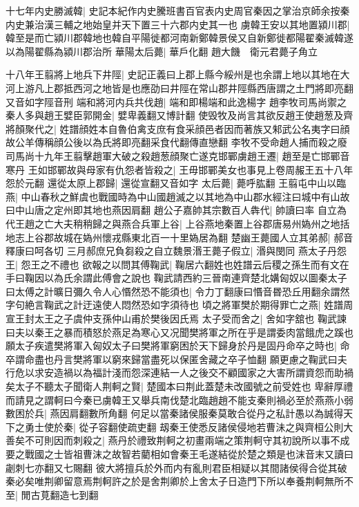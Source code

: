 十七年内史勝滅韓|{
	史記本紀作内史騰班書百官表内史周官秦因之掌治京師余按秦内史兼治漢三輔之地始皇并天下置三十六郡内史其一也}
虜韓王安以其地置潁川郡|{
	韓至是而亡潁川郡韓地也韓自平陽徙都河南新鄭韓景侯又自新鄭徙都陽翟秦滅韓遂以為陽翟縣為潁川郡治所}
華陽太后薨|{
	華戶化翻}
趙大饑　衛元君薨子角立

十八年王翦將上地兵下井陘|{
	史記正義曰上郡上縣今綏州是也余謂上地以其地在大河上游凡上郡抵西河之地皆是也應劭曰井陘在常山郡井陘縣西唐謂之土門將即亮翻又音如字陘音刑}
端和將河内兵共伐趙|{
	端和即楊端和此逸楊字}
趙李牧司馬尚禦之秦人多與趙王嬖臣郭開金|{
	嬖卑義翻又博計翻}
使毁牧及尚言其欲反趙王使趙葱及齊將顏聚代之|{
	姓譜顔姓本自魯伯禽支庶有食采顔邑者因而著族又邾武公名夷字曰顔故公羊傳稱顔公後以為氏將即亮翻采食代翻傳直戀翻}
李牧不受命趙人捕而殺之廢司馬尚十九年王翦擊趙軍大破之殺趙葱顔聚亡遂克邯鄲虜趙王遷|{
	趙至是亡邯鄲音寒丹}
王如邯鄲故與母家有仇怨者皆殺之|{
	王毋邯鄲美女也事見上卷周赧王五十八年怨於元翻}
還從太原上郡歸|{
	還從宣翻又音如字}
太后薨|{
	薨呼肱翻}
王翦屯中山以臨燕|{
	中山春秋之鮮虞也戰國時為中山國趙滅之以其地為中山郡水經注曰城中有山故曰中山唐之定州即其地也燕因肩翻}
趙公子嘉帥其宗數百人犇代|{
	帥讀曰率}
自立為代王趙之亡大夫稍稍歸之與燕合兵軍上谷|{
	上谷燕地秦置上谷郡唐易州媯州之地括地志上谷郡故城在媯州懷戎縣東北百一十里媯居為翻}
楚幽王薨國人立其弟郝|{
	郝音釋康曰呵各切}
三月郝庶兄負芻殺之自立魏景湣王薨子假立|{
	湣與閔同}
燕太子丹怨王|{
	怨王之不禮也}
欲報之以問其傅鞠武|{
	鞠居六翻姓也姓譜云后稷之孫生而有文在手曰鞠因以為氏余謂此傅會之說也}
鞠武請西約三晉南連齊楚北媾匈奴以圖秦太子曰太傅之計曠日彌久令人心惽然恐不能須也|{
	令力丁翻康曰惽音昬恐丘用翻余謂然字句絶言鞠武之計迂遠使人悶然恐如字須待也}
頃之將軍樊於期得罪亡之燕|{
	姓譜周宣王封太王之子虞仲支孫仲山甫於樊後因氏焉}
太子受而舍之|{
	舍如字舘也}
鞠武諫曰夫以秦王之暴而積怒於燕足為寒心又况聞樊將軍之所在乎是謂委肉當餓虎之蹊也願太子疾遣樊將軍入匈奴太子曰樊將軍窮困於天下歸身於丹是固丹命卒之時也|{
	命卒謂命盡也丹言樊將軍以窮來歸當盡死以保匿舍藏之卒子恤翻}
願更慮之鞠武曰夫行危以求安造禍以為福計淺而怨深連結一人之後交不顧國家之大害所謂資怨而助禍矣太子不聽太子聞衛人荆軻之賢|{
	楚國本曰荆此蓋楚未改國號之前受姓也}
卑辭厚禮而請見之謂軻曰今秦已虜韓王又舉兵南伐楚北臨趙趙不能支秦則禍必至於燕燕小弱數困於兵|{
	燕因肩翻數所角翻}
何足以當秦諸侯服秦莫敢合從丹之私計愚以為誠得天下之勇士使於秦|{
	從子容翻使疏吏翻}
刼秦王使悉反諸侯侵地若曹沬之與齊桓公則大善矣不可則因而刺殺之|{
	燕丹於禮致荆軻之初畫兩端之策荆軻守其初說所以事不成要之戰國之士皆祖曹沫之故智若藺相如會秦王毛遂結從於楚之類是也沫音末又讀曰劌刺七亦翻又七賜翻}
彼大將擅兵於外而内有亂則君臣相疑以其間諸侯得合從其破秦必矣唯荆卿留意焉荆軻許之於是舍荆卿於上舍太子日造門下所以奉養荆軻無所不至|{
	閒古莧翻造七到翻}
